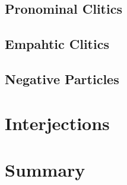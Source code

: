 \subsection{Pronominal Clitics}
\label{subsec:22:pronominal clitics}

\subsection{Empahtic Clitics}
\label{subsec:22:empahtic clitics}

\subsection{Negative Particles}
\label{subsec:22:negative particles}

\section{Interjections}
\label{sec:22:interjections}

\section{Summary}
\label{sec:22:summary}

